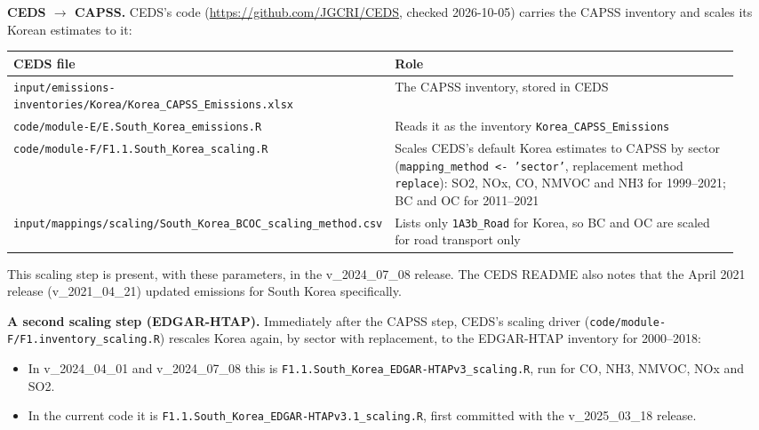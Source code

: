 \textbf{CEDS $\rightarrow$ CAPSS.} CEDS's code (\url{https://github.com/JGCRI/CEDS},
checked 2026-10-05) carries the CAPSS inventory and scales its Korean estimates to
it:

\begin{longtable}{@{}>{\raggedright\arraybackslash}p{0.45\linewidth}>{\raggedright\arraybackslash}p{0.5\linewidth}@{}}
\toprule
CEDS file & Role \\
\midrule
\endhead
\texttt{input/\allowbreak{}emissions-\allowbreak{}inventories/\allowbreak{}Korea/\allowbreak{}Korea\_\allowbreak{}CAPSS\_\allowbreak{}Emissions.\allowbreak{}xlsx}
  & The CAPSS inventory, stored in CEDS \\
\texttt{code/\allowbreak{}module-\allowbreak{}E/\allowbreak{}E.\allowbreak{}South\_\allowbreak{}Korea\_\allowbreak{}emissions.\allowbreak{}R}
  & Reads it as the inventory \texttt{Korea\_\allowbreak{}CAPSS\_\allowbreak{}Emissions} \\
\texttt{code/\allowbreak{}module-\allowbreak{}F/\allowbreak{}F1.\allowbreak{}1.\allowbreak{}South\_\allowbreak{}Korea\_\allowbreak{}scaling.\allowbreak{}R}
  & Scales CEDS's default Korea estimates to CAPSS by sector
    (\texttt{mapping\_\allowbreak{}method <- 'sector'}, replacement method
    \texttt{replace}): SO2, NOx, CO, NMVOC and NH3 for 1999--2021; BC and OC for
    2011--2021 \\
\texttt{input/\allowbreak{}mappings/\allowbreak{}scaling/\allowbreak{}South\_\allowbreak{}Korea\_\allowbreak{}BCOC\_\allowbreak{}scaling\_\allowbreak{}method.\allowbreak{}csv}
  & Lists only \texttt{1A3b\_\allowbreak{}Road} for Korea, so BC and OC are scaled
    for road transport only \\
\bottomrule
\end{longtable}

This scaling step is present, with these parameters, in the v\_2024\_07\_08 release.
The CEDS README also notes that the April 2021 release (v\_2021\_04\_21) updated
emissions for South Korea specifically.

\textbf{A second scaling step (EDGAR-HTAP).} Immediately after the CAPSS step,
CEDS's scaling driver
(\texttt{code/\allowbreak{}module-\allowbreak{}F/\allowbreak{}F1.\allowbreak{}inventory\_\allowbreak{}scaling.\allowbreak{}R})
rescales Korea again, by sector with replacement, to the EDGAR-HTAP inventory for
2000--2018:

\begin{itemize}
\tightlist
\item
  In v\_2024\_04\_01 and v\_2024\_07\_08 this is
  \texttt{F1.\allowbreak{}1.\allowbreak{}South\_\allowbreak{}Korea\_\allowbreak{}EDGAR-\allowbreak{}HTAPv3\_\allowbreak{}scaling.\allowbreak{}R},
  run for CO, NH3, NMVOC, NOx and SO2.
\item
  In the current code it is
  \texttt{F1.\allowbreak{}1.\allowbreak{}South\_\allowbreak{}Korea\_\allowbreak{}EDGAR-\allowbreak{}HTAPv3.\allowbreak{}1\_\allowbreak{}scaling.\allowbreak{}R},
  first committed with the v\_2025\_03\_18 release.
\end{itemize}

